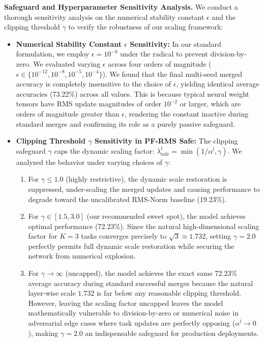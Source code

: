 \textbf{Safeguard and Hyperparameter Sensitivity Analysis.}
We conduct a thorough sensitivity analysis on the numerical stability constant $\epsilon$ and the clipping threshold $\gamma$ to verify the robustness of our scaling framework:
\begin{itemize}
    \item \textbf{Numerical Stability Constant $\epsilon$ Sensitivity:} In our standard formulation, we employ $\epsilon = 10^{-8}$ under the radical to prevent division-by-zero. We evaluated varying $\epsilon$ across four orders of magnitude ($\epsilon \in \{10^{-12}, 10^{-8}, 10^{-5}, 10^{-4}\}$). We found that the final multi-seed merged accuracy is completely insensitive to the choice of $\epsilon$, yielding identical average accuracies (73.22\%) across all values. This is because typical neural weight tensors have RMS update magnitudes of order $10^{-2}$ or larger, which are orders of magnitude greater than $\epsilon$, rendering the constant inactive during standard merges and confirming its role as a purely passive safeguard.
    \item \textbf{Clipping Threshold $\gamma$ Sensitivity in PF-RMS Safe:} The clipping safeguard $\gamma$ caps the dynamic scaling factor: $\lambda_{\text{safe}}^l = \min(1/\alpha^l, \gamma)$. We analyzed the behavior under varying choices of $\gamma$:
    \begin{enumerate}
        \item For $\gamma \le 1.0$ (highly restrictive), the dynamic scale restoration is suppressed, under-scaling the merged updates and causing performance to degrade toward the uncalibrated RMS-Norm baseline (19.23\%).
        \item For $\gamma \in [1.5, 3.0]$ (our recommended sweet spot), the model achieves optimal performance (72.23\%). Since the natural high-dimensional scaling factor for $K=3$ tasks converges precisely to $\sqrt{3} \approx 1.732$, setting $\gamma = 2.0$ perfectly permits full dynamic scale restoration while securing the network from numerical explosion.
        \item For $\gamma \to \infty$ (uncapped), the model achieves the exact same 72.23\% average accuracy during standard successful merges because the natural layer-wise scale $1.732$ is far below any reasonable clipping threshold. However, leaving the scaling factor uncapped leaves the model mathematically vulnerable to division-by-zero or numerical noise in adversarial edge cases where task updates are perfectly opposing ($\alpha^l \to 0$), making $\gamma = 2.0$ an indispensable safeguard for production deployments.
    \end{enumerate}
\end{itemize}

